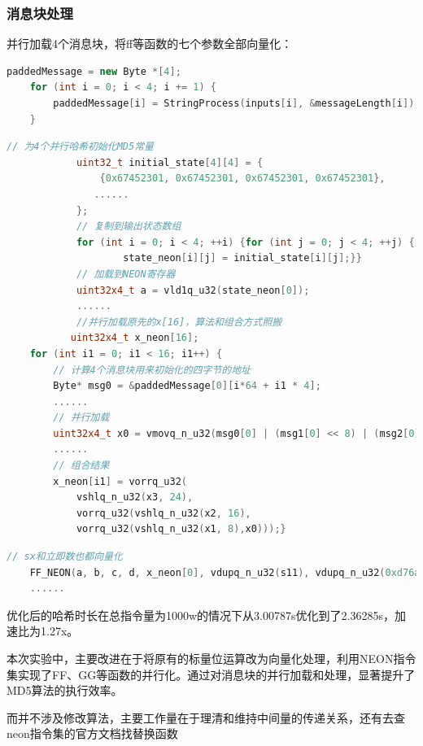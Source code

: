 \documentclass[a4paper]{article}
\begin{document}
\subsubsection{消息块处理}
并行加载4个消息块，将ff等函数的七个参数全部向量化：
\begin{lstlisting}[language=C++,caption=同步修改了stringprocess函数，用以填充paddedMessage数组]
    paddedMessage = new Byte *[4]; 
    for (int i = 0; i < 4; i += 1) {
        paddedMessage[i] = StringProcess(inputs[i], &messageLength[i]);
    }

    \end{lstlisting}
    
    \begin{lstlisting}[language=C++,caption=加载一些中间变量]
            // 为4个并行哈希初始化MD5常量
            uint32_t initial_state[4][4] = {
                {0x67452301, 0x67452301, 0x67452301, 0x67452301}, 
               ......
            };
            // 复制到输出状态数组
            for (int i = 0; i < 4; ++i) {for (int j = 0; j < 4; ++j) {
                    state_neon[i][j] = initial_state[i][j];}}
            // 加载到NEON寄存器
            uint32x4_t a = vld1q_u32(state_neon[0]); 
            ......
            //并行加载原先的x[16]，算法和组合方式照搬
           uint32x4_t x_neon[16];
    for (int i1 = 0; i1 < 16; i1++) {
        // 计算4个消息块用来初始化的四字节的地址
        Byte* msg0 = &paddedMessage[0][i*64 + i1 * 4];
        ......
        // 并行加载
        uint32x4_t x0 = vmovq_n_u32(msg0[0] | (msg1[0] << 8) | (msg2[0] << 16) | (msg3[0] << 24));
        ......  
        // 组合结果
        x_neon[i1] = vorrq_u32(
            vshlq_n_u32(x3, 24),
            vorrq_u32(vshlq_n_u32(x2, 16),
            vorrq_u32(vshlq_n_u32(x1, 8),x0)));}
    \end{lstlisting}

\begin{lstlisting}[language=C++,caption=hash函数具体执行示例]
    // sx和立即数也都向量化
    FF_NEON(a, b, c, d, x_neon[0], vdupq_n_u32(s11), vdupq_n_u32(0xd76aa478));
    ......
\end{lstlisting}
\par 优化后的哈希时长在总指令量为1000w的情况下从3.00787s优化到了2.36285s，加速比为1.27x。
\par 本次实验中，主要改进在于将原有的标量位运算改为向量化处理，利用NEON指令集实现了FF、GG等函数的并行化。通过对消息块的并行加载和处理，显著提升了MD5算法的执行效率。
\par 而并不涉及修改算法，主要工作量在于理清和维持中间量的传递关系，还有去查neon指令集的官方文档找替换函数
\end{document}
